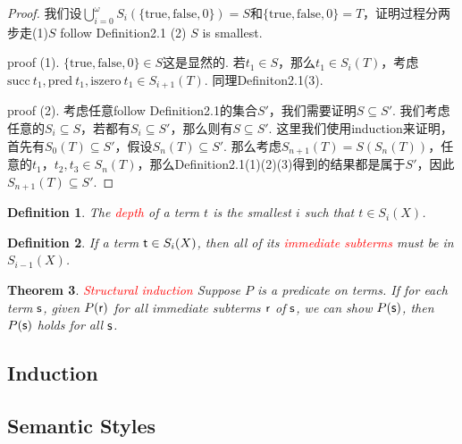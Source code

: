 \documentclass{article}
\theoremstyle{plain}
\newtheorem{theorem}{Theorem}
\newtheorem{definition}[theorem]{Definition}
\theoremstyle{nonumberplain}
\newtheorem{proof}{Proof}
\newcommand{\term}[1]{\ensuremath\mathsf{#1}}
\newcommand{\redt}[1]{\textcolor{red}{#1}}
\begin{document}
\begin{proof}
我们设$\bigcup_{i = 0}^{\omega} S_i(\{\text{true},\text{false},0\}) = S$和$\{\text{true},\text{false},0\} = T$，证明过程分两步走(1)$S$ follow Definition2.1 (2) $S$ is smallest.

proof (1). $\{\text{true},\text{false},0\} \in S$这是显然的. 若$t_1 \in S$，那么$t_1 \in S_i(T)$，考虑$\text{succ}\ t_1, \text{pred}\ t_1, \text{iszero}\ t_1 \in S_{i+1}(T)$.  同理Definiton2.1(3).

proof (2). 考虑任意follow Definition2.1的集合$S'$，我们需要证明$S \subseteq S'$.  我们考虑任意的$S_i \subseteq S$，若都有$S_i \subseteq S'$，那么则有$S \subseteq S'$. 这里我们使用induction来证明，首先有$S_0(T) \subseteq S'$，假设$S_n(T) \subseteq S'$. 那么考虑$S_{n+1}(T) = S(S_n(T))$，任意的$t_1，t_2, t_3 \in S_n(T)$，那么Definition2.1(1)(2)(3)得到的结果都是属于$S'$，因此$S_{n+1}(T) \subseteq S'$.  
\end{proof}

\begin{definition}
\rm The \redt{depth} of a term $t$ is the smallest $i$ such that $t \in S_i(X)$. 
\end{definition}

\begin{definition}
\rm If a term $\term{t} \in S_i(X)$, then all of its \redt{immediate subterms} must be in $S_{i-1}(X)$. 
\end{definition}


\begin{theorem}
\rm \redt{Structural induction} Suppose $P$ is a predicate on terms. If for each term $\term{s}$, given $P(\term{r})$ for all immediate subterms $\term{r}$ of $\term{s}$, we can show $P(\term{s})$, then $P(\term{s})$ holds for all $\term{s}$. 
\end{theorem}



\subsection{Induction}


\newpage
\subsection{Semantic Styles}
\end{document}

